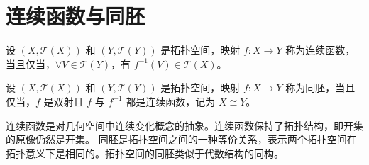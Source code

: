 \section{连续函数与同胚}

\begin{definition}
    设 $ (X,\mathcal{T}(X)) $ 和 $ (Y,\mathcal{T}(Y)) $ 是拓扑空间，映射 $ f:X\to Y $ 称为连续函数，当且仅当，$ \forall V\in \mathcal{T}(Y) $，有 $ f^{-1}(V)\in \mathcal{T}(X) $。
\end{definition}
\begin{definition}[同胚 Homeomorphism]
    设 $ (X,\mathcal{T}(X)) $ 和 $ (Y,\mathcal{T}(Y)) $ 是拓扑空间，映射 $ f:X\to Y $ 称为同胚，当且仅当，$ f $ 是双射且 $ f $ 与 $ f^{-1} $ 都是连续函数，记为 $ X \cong Y $。
\end{definition}
\begin{note}
    连续函数是对几何空间中连续变化概念的抽象。连续函数保持了拓扑结构，即开集的原像仍然是开集。
    同胚是拓扑空间之间的一种等价关系，表示两个拓扑空间在拓扑意义下是相同的。拓扑空间的同胚类似于代数结构的同构。
\end{note}

\newpage